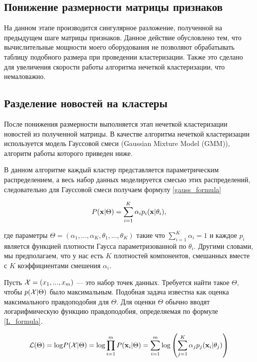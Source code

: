 \subsection{Понижение размерности матрицы признаков}

На данном этапе производится сингулярное разложение, полученной на предыдущем шаге матрицы признаков. Данное действие обусловлено тем, что вычислительные мощности моего оборудования не позволяют обрабатывать таблицу подобного размера при проведении кластеризации. Также это сделано для увеличения скорости работы алгоритма нечеткой кластеризации, что немаловажно.


\subsection{Разделение новостей на кластеры}

После понижения размерности выполняется этап нечеткой кластеризации новостей из полученной матрицы. В качестве алгоритма нечеткой кластеризации используется модель Гауссовой смеси (Gaussian Mixture Model (GMM)), алгоритм работы которого приведен ниже.

В данном алгоритме каждый кластер представляется параметрическим распределением, а весь набор данных моделируется смесью этих распределений, следовательно для Гауссовой смеси получаем формулу \ref{gauss_formula}

\begin{equation}
\label{gauss_formula}
P({\bf x}\vert \Theta)=\sum_{i=1}^K \alpha_i p_i({\bf x}\vert \theta_i),
\end{equation}

где параметры $\Theta = (\alpha_1,...,\alpha_K, \theta_1,...,\theta_K)$ такие что $\sum_{i=1}^{K}\alpha_i = 1$ и каждое $p_i$ является функцией плотности Гаусса параметризованной по $\theta_i$. Другими словами, мы предполагаем, что у нас есть $K$ плотностей компонентов, смешанных вместе с $K$ коэффициентами смешения $\alpha_i$.

Пусть ${\cal X} = (x_1,...,x_m)$ --- это набор точек данных. Требуется найти такое $\Theta$, чтобы $p({\cal X}\vert\Theta)$ было максимальным. Подобная задача известна как оценка максимального правдоподобия для $\Theta$. Для оценки $\Theta$ обычно вводят логарифмическую функцию правдоподобия, определяемая по формуле \ref{L_formula}.

\begin{equation}
\label{L_formula}
{\cal L}(\Theta)={\rm log} P({\cal X}\vert \Theta)={\rm log} \prod_{i=1}^m P({\bf x}_i \vert \Theta) =\sum_{i=1}^m {\rm log} \left( \sum_{j=1}^K \alpha_j p_j({\bf x}_i\vert \theta_j)\right)
\end{equation}

